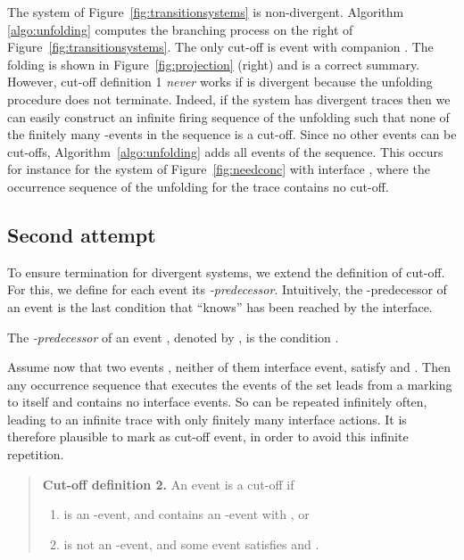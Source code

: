 \documentclass{llncs}
\begin{document}
The system of Figure~\ref{fig:transitionsystems} is non-divergent. 
Algorithm \ref{algo:unfolding} computes the branching process 
on the right of Figure~\ref{fig:transitionsystems}. The only cut-off is
event  with companion . The folding is shown in Figure~\ref{fig:projection} (right) and is a correct summary.
However, cut-off definition 1 {\em never} works if  is divergent
because the unfolding procedure does not terminate. Indeed, if the system 
has divergent traces then we can easily construct an infinite firing sequence of the unfolding such that none of the finitely many -events 
in the sequence is a cut-off. Since no other events can be cut-offs, Algorithm~\ref{algo:unfolding} adds all events of the sequence. This occurs for 
instance for the system of Figure~\ref{fig:needconc} with interface , where the occurrence sequence of the unfolding for the trace  contains no cut-off.


\subsection{Second attempt} 
To ensure termination for divergent systems, we extend the definition of cut-off. For this, we define for each event  its {\em -predecessor}. Intuitively, the -predecessor of an event  is the last condition that  ``knows'' has been
reached by the interface. 

\begin{definition}
The 
{\em -predecessor} of an event , denoted by , is the condition .
\end{definition}

Assume now that two events , neither of them interface event, satisfy 
and . Then any occurrence sequence  that executes 
the events of the set  leads from a marking to itself and 
contains no interface events. So  can be repeated infinitely often,
leading to an infinite trace with only finitely many interface actions. It is therefore
plausible to mark  as cut-off event, in order to avoid this infinite repetition.

\begin{quote}
{\bf Cut-off definition 2.} An event  is a cut-off if 
\begin{enumerate}
\item[(1)]  is an -event, and  contains an -event  with , or
\item[(2)]  is not an -event, and some event  satisfies  and .
\end{enumerate}
\end{quote}
\end{document}
